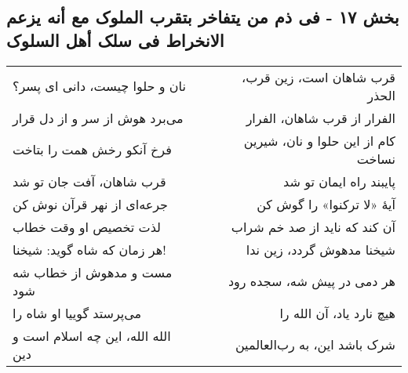 \begin{center}
\section*{بخش ۱۷ - فی ذم من یتفاخر بتقرب الملوک مع أنه یزعم الانخراط فی سلک أهل السلوک}
\label{sec:017}
\begin{longtable}{l p{0.5cm} r}
نان و حلوا چیست، دانی ای پسر؟
&&
قرب شاهان است، زین قرب، الحذر
\\
می‌برد هوش از سر و از دل قرار
&&
الفرار از قرب شاهان، الفرار
\\
فرخ آنکو رخش همت را بتاخت
&&
کام از این حلوا و نان، شیرین نساخت
\\
قرب شاهان، آفت جان تو شد
&&
پایبند راه ایمان تو شد
\\
جرعه‌ای از نهر قرآن نوش کن
&&
آیهٔ «لا ترکنوا» را گوش کن
\\
لذت تخصیص او وقت خطاب
&&
آن کند که ناید از صد خم شراب
\\
هر زمان که شاه گوید: شیخنا!
&&
شیخنا مدهوش گردد، زین ندا
\\
مست و مدهوش از خطاب شه شود
&&
هر دمی در پیش شه، سجده رود
\\
می‌پرستد گوییا او شاه را
&&
هیچ نارد یاد، آن الله را
\\
الله الله، این چه اسلام است و دین
&&
شرک باشد این، به رب‌العالمین
\\
\end{longtable}
\end{center}
